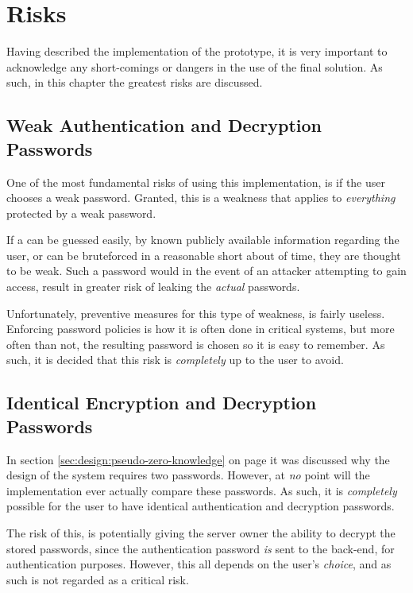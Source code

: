 \chapter{Risks}
	Having described the implementation of the prototype, it is very important to acknowledge any short-comings or dangers in the use of the final solution. As such, in this chapter the greatest risks are discussed.
	

	\section{Weak Authentication and Decryption Passwords}
		One of the most fundamental risks of using this implementation, is if the user chooses a weak password. Granted, this is a weakness that applies to \emph{everything} protected by a weak password.

		If a can be guessed easily, by known publicly available information regarding the user, or can be bruteforced in a reasonable short about of time, they are thought to be weak. Such a password would in the event of an attacker attempting to gain access, result in greater risk of leaking the \emph{actual} passwords.

		Unfortunately, preventive measures for this type of weakness, is fairly useless. Enforcing password policies is how it is often done in critical systems, but more often than not, the resulting password is chosen so it is easy to remember. As such, it is decided that this risk is \emph{completely} up to the user to avoid.

	\section{Identical Encryption and Decryption Passwords}
		In section \ref{sec:design:pseudo-zero-knowledge} on page \pageref{sec:design:pseudo-zero-knowledge} it was discussed why the design of the system requires two passwords. However, at \emph{no} point will the implementation ever actually compare these passwords. As such, it is \emph{completely} possible for the user to have identical authentication and decryption passwords.

		The risk of this, is potentially giving the server owner the ability to decrypt the stored passwords, since the authentication password \emph{is} sent to the back-end, for authentication purposes. However, this all depends on the user's \emph{choice}, and as such is not regarded as a critical risk.
	
